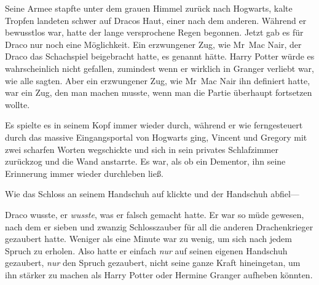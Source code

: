Seine Armee stapfte unter dem grauen Himmel zurück nach Hogwarts, kalte Tropfen landeten schwer auf Dracos Haut, einer nach dem anderen. Während er bewusstlos war, hatte der lange versprochene Regen begonnen. Jetzt gab es für Draco nur noch eine Möglichkeit. Ein erzwungener Zug, wie Mr~Mac Nair, der Draco das Schachspiel beigebracht hatte, es genannt hätte. Harry Potter würde es wahrscheinlich nicht gefallen, zumindest wenn er wirklich in Granger verliebt war, wie alle sagten. Aber ein erzwungener Zug, wie Mr~Mac Nair ihn definiert hatte, war ein Zug, den man machen musste, wenn man die Partie überhaupt fortsetzen wollte.

Es spielte es in seinem Kopf immer wieder durch, während er wie ferngesteuert durch das massive Eingangsportal von Hogwarts ging, Vincent und Gregory mit zwei scharfen Worten wegschickte und sich in sein privates Schlafzimmer zurückzog und die Wand anstarrte. Es war, als ob ein Dementor, ihn seine Erinnerung immer wieder durchleben ließ.

Wie das Schloss an seinem Handschuh auf klickte und der Handschuh abfiel—

Draco wusste, er \emph{wusste}, was er falsch gemacht hatte. Er war so müde gewesen, nach dem er sieben und zwanzig Schlosszauber für all die anderen Drachenkrieger gezaubert hatte. Weniger als eine Minute war zu wenig, um sich nach jedem Spruch zu erholen. Also hatte er einfach \emph{nur}  auf seinen eigenen Handschuh gezaubert, \emph{nur} den Spruch gezaubert, nicht seine ganze Kraft hineingetan, um ihn stärker zu machen als Harry Potter oder Hermine Granger aufheben könnten.


